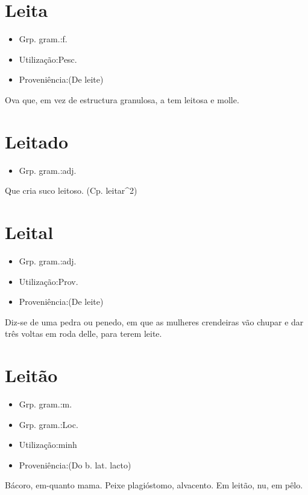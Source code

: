 \section{Leita}
\begin{itemize}
\item {Grp. gram.:f.}
\end{itemize}
\begin{itemize}
\item {Utilização:Pesc.}
\end{itemize}
\begin{itemize}
\item {Proveniência:(De \textunderscore leite\textunderscore )}
\end{itemize}
Ova que, em vez de estructura granulosa, a tem leitosa e molle.
\section{Leitado}
\begin{itemize}
\item {Grp. gram.:adj.}
\end{itemize}
Que cria suco leitoso.
(Cp. \textunderscore leitar\textunderscore ^2)
\section{Leital}
\begin{itemize}
\item {Grp. gram.:adj.}
\end{itemize}
\begin{itemize}
\item {Utilização:Prov.}
\end{itemize}
\begin{itemize}
\item {Proveniência:(De \textunderscore leite\textunderscore )}
\end{itemize}
Diz-se de uma pedra ou penedo, em que as mulheres crendeiras vão chupar e dar três voltas em roda delle, para terem leite.
\section{Leitão}
\begin{itemize}
\item {Grp. gram.:m.}
\end{itemize}
\begin{itemize}
\item {Grp. gram.:Loc.}
\end{itemize}
\begin{itemize}
\item {Utilização:minh}
\end{itemize}
\begin{itemize}
\item {Proveniência:(Do b. lat. \textunderscore lacto\textunderscore )}
\end{itemize}
Bácoro, em-quanto mama.
Peixe plagióstomo, alvacento.
\textunderscore Em leitão\textunderscore , nu, em pêlo.
